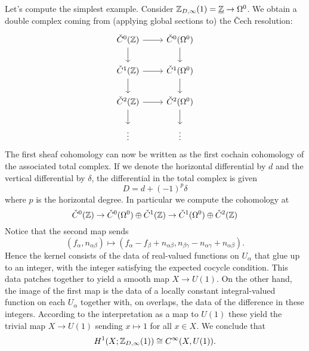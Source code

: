 \documentclass{amsart}
\begin{document}
Let's compute the simplest example. Consider $\mathbb{Z}_{D,\infty}(1)=\underline{\mathbb{Z}}\to\Omega^0$.
We obtain a double complex coming from (applying global sections to) the \v Cech resolution:
\begin{equation*}
    \begin{tikzcd}
        \check C^0(\Z) \rar\dar & \check C^0(\Omega^0)\dar \\
        \check C^1(\Z) \rar\dar & \check C^1(\Omega^0)\dar \\
        \check C^2(\Z) \rar\dar & \check C^2(\Omega^0)\dar \\
        \vdots & \vdots
    \end{tikzcd}
\end{equation*}
The first sheaf cohomology can now be written as the first cochain cohomology of the
associated total complex. If we denote the horizontal differential by $d$ and the vertical
differential by $\delta$, the differential in the total complex is given
\begin{equation*}
    D = d + (-1)^p\delta
\end{equation*}
where $p$ is the horizontal degree. In particular we compute the cohomology at
\begin{equation*}
    \check C^0(\mathbb{Z}) \to \check C^0(\Omega^0) \oplus \check C^1(\mathbb{Z}) \to \check C^1(\Omega^0)\oplus \check C^2(\mathbb{Z})
\end{equation*}
Notice that the second map sends
\begin{equation*}
    (f_\alpha, n_{\alpha\beta})\mapsto(f_\alpha-f_\beta + n_{\alpha\beta},n_{\beta\gamma}-n_{\alpha\gamma}+n_{\alpha\beta}).
\end{equation*}
Hence the kernel consists of the data of real-valued functions on $U_\alpha$ that
glue up to an integer, with the integer satisfying the expected cocycle condition.
This data patches together to yield a smooth map $X\to U(1)$.
On the other hand, the image of the first map is the data of a locally constant
integral-valued function on each $U_\alpha$ together with, on overlaps, the
data of the difference in these integers. According to the interpretation as
a map to $U(1)$ these yield the trivial map $X\to U(1)$ sending $x\mapsto 1$
for all $x\in X$. We conclude that
\begin{equation*}
    H^1(X; \mathbb{Z}_{D,\infty}(1)) \cong C^\infty(X, U(1)).
\end{equation*}
\end{document}
